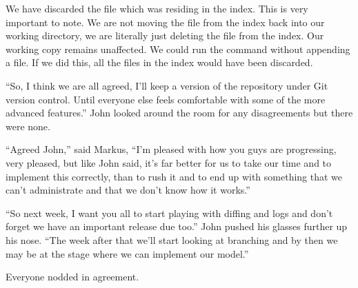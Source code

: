 
We have discarded the file which was residing in the index.
This is very important to note.
We are not moving the file from the index back into our working directory, we are literally just deleting the file from the index.
Our working copy remains unaffected.
We could run the  command without appending a file.
If we did this, all the files in the index would have been discarded.

\begin{trenches}
``So, I think we are all agreed, I'll keep a version of the repository under Git version control.
Until everyone else feels comfortable with some of the more advanced features.'' John looked around the room for any disagreements but there were none.

``Agreed John,'' said Markus, ``I'm pleased with how you guys are progressing, very pleased, but like John said, it's far better for us to take our time and to implement this correctly, than to rush it and to end up with something that we can't administrate and that we don't know how it works.''

``So next week, I want you all to start playing with diffing and logs and don't forget we have an important release due too.'' John pushed his glasses further up his nose.
``The week after that we'll start looking at branching and by then we may be at the stage where we can implement our model.''

Everyone nodded in agreement.
\end{trenches}

